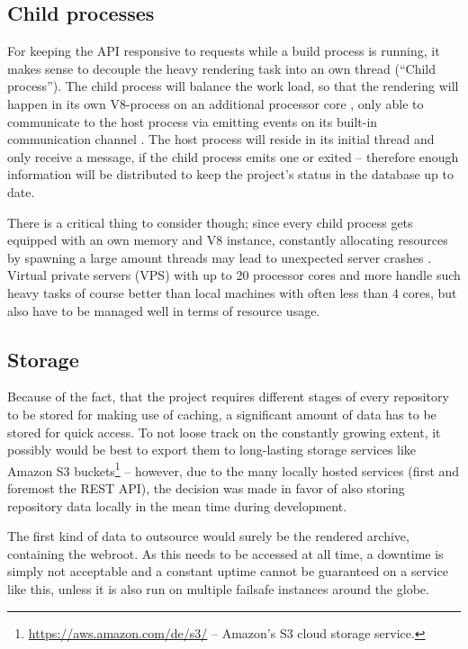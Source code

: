 \subsection{Child processes}
For keeping the API responsive to requests while a build process is running, it makes sense to decouple the heavy rendering task into an own thread (``Child process''). The child process will balance the work load, so that the rendering will happen in its own V8-process on an additional processor core \cite[335]{cantelon2017node}, only able to communicate to the host process via emitting events on its built-in communication channel \cite{NodejsChildProcesses}. The host process will reside in its initial thread and only receive a message, if the child process emits one or exited -- therefore enough information will be distributed to keep the project's status in the database up to date.

There is a critical thing to consider though; since every child process gets equipped with an own memory and V8 instance, constantly allocating resources by spawning a large amount threads may lead to unexpected server crashes \cite{NodejsChildProcesses}. Virtual private servers (VPS) with up to 20 processor cores and more handle such heavy tasks of course better than local machines with often less than 4 cores, but also have to be managed well in terms of resource usage.

\subsection{Storage}
Because of the fact, that the project requires different stages of every repository to be stored for making use of caching, a significant amount of data has to be stored for quick access. To not loose track on the constantly growing extent, it possibly would be best to export them to long-lasting storage services like Amazon S3 buckets\footnote{\url{https://aws.amazon.com/de/s3/} -- Amazon's S3 cloud storage service.} -- however, due to the many locally hosted services (first and foremost the REST API), the decision was made in favor of also storing repository data locally in the mean time during development.

The first kind of data to outsource would surely be the rendered archive, containing the webroot. As this needs to be accessed at all time, a downtime is simply not acceptable and a constant uptime cannot be guaranteed on a service like this, unless it is also run on multiple failsafe instances around the globe.

